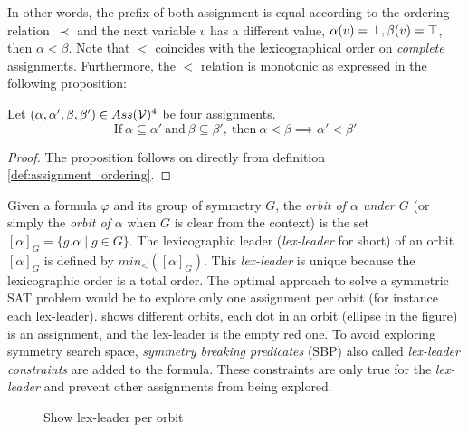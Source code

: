 In other words, the prefix of both assignment is equal according to the ordering relation~$\prec$
and the next variable $v$ has a different value, $\alpha(v) = \bot, \beta(v) = \top$, then $\alpha < \beta$.
Note that $<$ coincides with the lexicographical order on \emph{complete}
assignments. 
Furthermore, the $<$ relation is monotonic as expressed in the following proposition:
\begin{proposition}
 \label{prop:monocity_assignments_ordering}
 Let  $(\alpha,\alpha',\beta,\beta') \in Ass(\mathcal{V})^4 $ be four assignments.
 $$\text{If}~\alpha \subseteq \alpha'~\text{and}~\beta \subseteq \beta',~\text{then}~\alpha < \beta \implies \alpha' < \beta'$$
\end{proposition}
\begin{proof}
 The proposition follows on directly from definition \ref{def:assignment_ordering}.
\end{proof}

Given a formula $\varphi$ and its group of symmetry $G$,
the \emph{orbit of $\alpha$ under $G$} (or
simply the \emph{orbit of $\alpha$} when $G$ is clear from the context) is the set
$ [\alpha]_G=\{ g.\alpha \mid g \in G \}$. 
The lexicographic leader (\textit{lex-leader} for short) of an orbit $[\alpha]_G$ is defined by
$min_<([\alpha]_G)$. This \textit{lex-leader} is unique because the lexicographic
order is a total order.
The optimal approach to solve a symmetric SAT problem would be to explore
only one assignment per orbit (for instance each lex-leader).  shows different orbits, each dot in an orbit (ellipse in the figure) is an assignment, and the lex-leader is the empty red one.
To avoid exploring 
symmetry search space, \emph{symmetry breaking predicates} (SBP) also called \emph{lex-leader constraints} 
are added to the formula.
These constraints are only true for the \emph{lex-leader} \cite{crawford1996symmetry} and prevent other assignments from being explored. 
\begin{figure}[!htbp]
 \centering
 
 \caption{Show lex-leader per orbit}
 \label{fig:lex-leader}
\end{figure}

